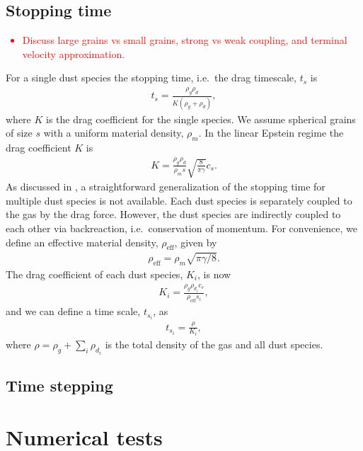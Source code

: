 \documentclass[fleqn,usenatbib]{mnras}
\begin{document}
\subsection{Stopping time}

\textcolor{red}{
\begin{itemize}
   \item Discuss large grains vs small grains, strong vs weak coupling, and
      terminal velocity approximation.
\end{itemize}
}
For a single dust species the stopping time, i.e.\ the drag timescale, $t_s$ is
%
\begin{align}
   t_s = \frac{\rho_g \rho_d}{K (\rho_g + \rho_d)},
\end{align}
%
where $K$ is the drag coefficient for the single species. We assume spherical
grains of size $s$ with a uniform material density, $\rho_m$. In the linear
Epstein regime \citep{Epstein:1924} the drag coefficient $K$ is
%
\begin{align}
   K = \frac{\rho_g \rho_d}{\rho_m s} \sqrt{\frac{8}{\pi\gamma}} c_s.
\end{align}
%
As discussed in \citet{Hutchison:2018}, a straightforward generalization of the
stopping time for multiple dust species is not available. Each dust species is
separately coupled to the gas by the drag force. However, the dust species are
indirectly coupled to each other via backreaction, i.e.\ conservation of
momentum. For convenience, we define an effective material density,
$\rho_{\mathrm{eff}}$, given by
%
\begin{align}
   \rho_{\mathrm{eff}} = \rho_m \sqrt{\pi\gamma/8}.
\end{align}
%
The drag coefficient of each dust species, $K_i$, is now
%
\begin{align}
   K_i = \frac{\rho_g \rho_{d_i} c_s}{\rho_{\mathrm{eff}} s_i},
\end{align}
%
and we can define a time scale, $t_{s_i}$, as
%
\begin{align}
   t_{s_i} = \frac{\rho}{K_i},
\end{align}
%
where $\rho = \rho_g + \sum_i \rho_{d_i}$ is the total density of the gas and
all dust species.

\subsection{Time stepping}

\section{Numerical tests}
\end{document}
